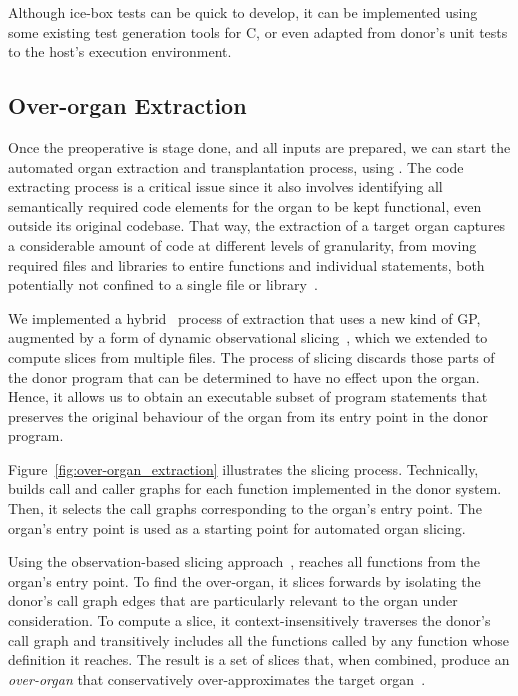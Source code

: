 Although ice-box tests can be quick to develop, it can be implemented using some existing test generation tools for C, or even adapted from donor’s unit tests to the host’s execution environment. 

\subsection{Over-organ Extraction}
Once the preoperative is stage done, and all inputs are prepared, we can start the automated organ extraction and transplantation process, using \autoscalpel. The code extracting process is a critical issue since it also involves identifying all semantically required code elements for the organ to be kept functional, even outside its original codebase. That way, the extraction of a target organ captures a considerable amount of code at different levels of granularity, from moving required files and libraries to entire functions and individual statements, both potentially not confined to a single file or library~\cite{Petrenko2009}.

We implemented a hybrid~\cite{Assuncao2017} process of extraction that uses a new kind of  GP, augmented by a form of dynamic observational slicing~\cite{Barr2015}, which we extended to compute slices from multiple files. The process of slicing discards those parts of the donor program that can be determined to have no effect upon the organ. Hence, it allows us to obtain an executable subset of program statements that preserves the original behaviour of the organ from its entry point in the donor program.

Figure~\ref{fig:over-organ_extraction} illustrates the slicing process. Technically, \autoscalpel builds call and caller graphs for each function implemented in the donor system. Then, it selects the call graphs corresponding to the organ's entry point. The organ's entry point is used as a starting point for automated organ slicing.

Using the observation-based slicing approach~\cite{Binkley:2014:OLP:2635868.2635893}, \autoscalpel reaches all functions from the organ's entry point. To find the over-organ, it slices forwards by isolating the donor's call graph edges that are particularly relevant to the organ under consideration. To compute a slice, it context-insensitively traverses the donor's call graph and transitively includes all the functions called by any function whose definition it reaches. The result is a set of slices that, when combined, produce an \emph{over-organ} that conservatively over-approximates the target organ~\cite{Barr2015}.

